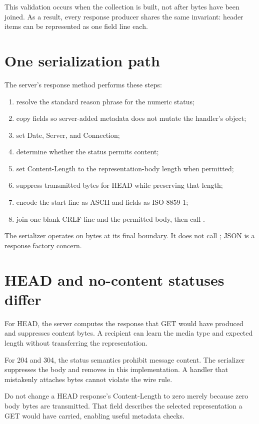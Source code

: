 This validation occurs when the collection is built, not after bytes have been
joined. As a result, every response producer shares the same invariant: header
items can be represented as one field line each.

\section{One serialization path}

The server's response method performs these steps:

\begin{enumerate}
  \item resolve the standard reason phrase for the numeric status;
  \item copy fields so server-added metadata does not mutate the handler's object;
  \item set Date, Server, and Connection;
  \item determine whether the status permits content;
  \item set Content-Length to the representation-body length when permitted;
  \item suppress transmitted bytes for HEAD while preserving that length;
  \item encode the start line as ASCII and fields as ISO-8859-1;
  \item join one blank CRLF line and the permitted body, then call .
\end{enumerate}

The serializer operates on bytes at its final boundary. It does not call
; JSON is a response factory concern.

\section{HEAD and no-content statuses differ}

For HEAD, the server computes the response that GET would have produced and
suppresses content bytes. A recipient can learn the media type and expected
length without transferring the representation.

For 204 and 304, the status semantics prohibit message content. The serializer
suppresses the body and removes  in this implementation.
A handler that mistakenly attaches bytes cannot violate the wire rule.

\begin{pitfall}
Do not change a HEAD response's Content-Length to zero merely because zero body
bytes are transmitted. That field describes the selected representation a GET
would have carried, enabling useful metadata checks.
\end{pitfall}

